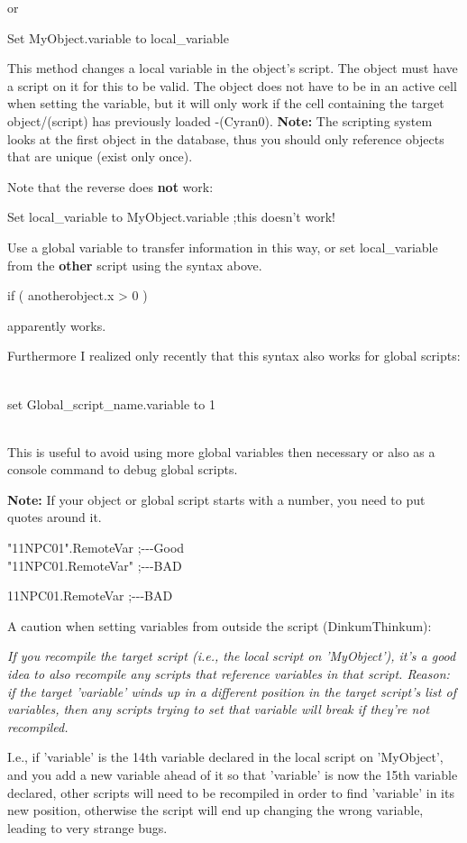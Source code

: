 \documentclass[
]{article}
\begin{document}
or

Set MyObject.variable to local\_variable

This method changes a local variable in the object's script. The object
must have a script on it for this to be valid. The object does not have
to be in an active cell when setting the variable, but it will only work
if the cell containing the target object/(script) has previously loaded
-(Cyran0). \textbf{Note:} The scripting system looks at the first object
in the database, thus you should only reference objects that are unique
(exist only once).

Note that the reverse does \textbf{not} work:

Set local\_variable to MyObject.variable ;this doesn't work!

Use a global variable to transfer information in this way, or set
local\_variable from the \textbf{other} script using the syntax above.

if ( anotherobject.x \textgreater{} 0 )

apparently works.

Furthermore I realized only recently that this syntax also works for
global scripts:\\
\strut \\
set Global\_script\_name.variable to 1\\
\strut \\
This is useful to avoid using more global variables then necessary or
also as a console command to debug global scripts.

\textbf{Note:} If your object or global script starts with a number, you
need to put quotes around it.

"11NPC01".RemoteVar ;-\/-\/-Good\\
"11NPC01.RemoteVar" ;-\/-\/-BAD

11NPC01.RemoteVar ;-\/-\/-BAD

A caution when setting variables from outside the script
(DinkumThinkum):

\emph{If you recompile the target script (i.e., the local script on
'MyObject'), it's a good idea to also recompile any scripts that
reference variables in that script. Reason: if the target 'variable'
winds up in a different position in the target script's list of
variables, then any scripts trying to set that variable will break if
they're not recompiled.}

I.e., if 'variable' is the 14th variable declared in the local script on
'MyObject', and you add a new variable ahead of it so that 'variable' is
now the 15th variable declared, other scripts will need to be recompiled
in order to find 'variable' in its new position, otherwise the script
will end up changing the wrong variable, leading to very strange bugs.
\end{document}

